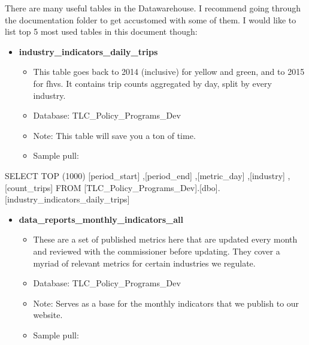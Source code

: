 \documentclass[
]{book}
\newenvironment{Shaded}{\begin{snugshade}}{\end{snugshade}}
\newcommand{\DecValTok}[1]{\textcolor[rgb]{0.00,0.00,0.81}{#1}}
\newcommand{\FunctionTok}[1]{\textcolor[rgb]{0.00,0.00,0.00}{#1}}
\newcommand{\NormalTok}[1]{#1}
\providecommand{\tightlist}{%
  \setlength{\itemsep}{0pt}\setlength{\parskip}{0pt}}
\begin{document}
There are many useful tables in the Datawarehouse. I recommend going through the documentation folder to get accustomed with some of them. I would like to list top 5 most used tables in this document though:

\begin{itemize}
\tightlist
\item
  \textbf{industry\_indicators\_daily\_trips}

  \begin{itemize}
  \tightlist
  \item
    This table goes back to 2014 (inclusive) for yellow and green, and to 2015 for fhvs. It contains trip counts aggregated by day, split by every industry.
  \item
    Database: TLC\_Policy\_Programs\_Dev
  \item
    Note: This table will save you a ton of time.
  \item
    Sample pull:
  \end{itemize}
\end{itemize}

\begin{Shaded}
\begin{Highlighting}[]
\NormalTok{SELECT }\FunctionTok{TOP}\NormalTok{ (}\DecValTok{1000}\NormalTok{) [period\_start]}
\NormalTok{      ,[period\_end]}
\NormalTok{      ,[metric\_day]}
\NormalTok{      ,[industry]}
\NormalTok{      ,[count\_trips]}
\NormalTok{  FROM [TLC\_Policy\_Programs\_Dev].[dbo].[industry\_indicators\_daily\_trips]}
\end{Highlighting}
\end{Shaded}

\begin{itemize}
\tightlist
\item
  \textbf{data\_reports\_monthly\_indicators\_all}

  \begin{itemize}
  \tightlist
  \item
    These are a set of published metrics here that are updated every month and reviewed with the commissioner before updating. They cover a myriad of relevant metrics for certain industries we regulate.
  \item
    Database: TLC\_Policy\_Programs\_Dev
  \item
    Note: Serves as a base for the monthly indicators that we publish to our website.
  \item
    Sample pull:
  \end{itemize}
\end{itemize}
\end{document}
